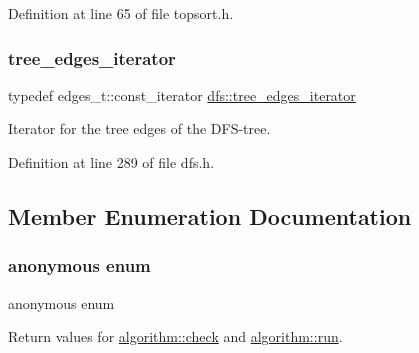 Definition at line 65 of file topsort.\+h.

\mbox{\label{classdfs_accde8d5403404f6d22fe4756d4ffedd5}} 
\subsubsection{\texorpdfstring{tree\+\_\+edges\+\_\+iterator}{tree\_edges\_iterator}}
{\footnotesize\ttfamily typedef edges\+\_\+t\+::const\+\_\+iterator \mbox{\hyperlink{classdfs_accde8d5403404f6d22fe4756d4ffedd5}{dfs\+::tree\+\_\+edges\+\_\+iterator}}\hspace{0.3cm}{\ttfamily [inherited]}}



Iterator for the tree edges of the D\+F\+S-\/tree. 



Definition at line 289 of file dfs.\+h.



\subsection{Member Enumeration Documentation}
\mbox{\label{classalgorithm_af1a0078e153aa99c24f9bdf0d97f6710}} 
\subsubsection{\texorpdfstring{anonymous enum}{anonymous enum}}
{\footnotesize\ttfamily anonymous enum\hspace{0.3cm}{\ttfamily [inherited]}}



Return values for \mbox{\hyperlink{classalgorithm_a76361fb03ad1cf643affc51821e43bed}{algorithm\+::check}} and \mbox{\hyperlink{classalgorithm_a734b189509a8d6b56b65f8ff772d43ca}{algorithm\+::run}}. 

